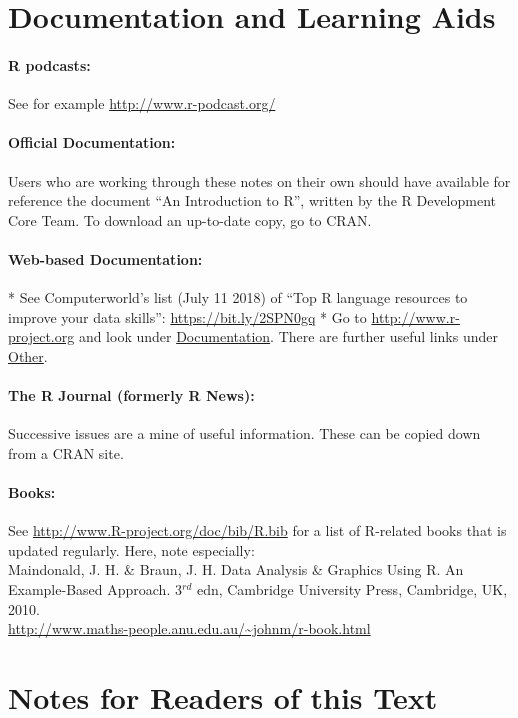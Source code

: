 \section*{Documentation and Learning Aids}
\paragraph{R podcasts:} See for example
\url{http://www.r-podcast.org/}

\paragraph{Official Documentation:}
Users who are working through these notes on their own should
have available for reference the document
``An Introduction to R'', written by the R Development Core Team.
To download an up-to-date copy, go to CRAN.

\paragraph{Web-based Documentation:}

* See Computerworld's list (July 11 2018) of ``Top R language
resources to improve your data skills'':  
\url{https://bit.ly/2SPN0gq}
* Go to \url{http://www.r-project.org}
and look under \underline{Documentation}.
There are further useful links under \underline{Other}.

\paragraph{The R Journal (formerly R News):}
Successive issues are a mine of useful information.
These can be copied down from a CRAN site.

\paragraph{Books:}
See \url{http://www.R-project.org/doc/bib/R.bib} for a list of
R-related books that is updated regularly. Here, note
especially:\\[3pt]
\noindent
Maindonald, J. H. \& Braun, J. H. Data Analysis \&
  Graphics Using R. An Example-Based Approach. 3$^{rd}$ edn, Cambridge
  University Press,
  Cambridge, UK, 2010.\\
\noindent
\url{http://www.maths-people.anu.edu.au/~johnm/r-book.html}

\cleardoublepage
\section*{Notes for Readers of this Text}

